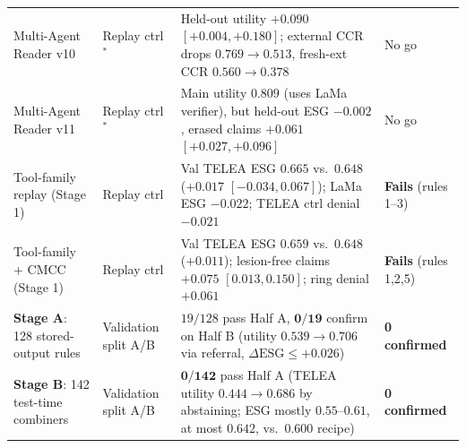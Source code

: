 \documentclass[5p,times,twocolumn,authoryear]{elsarticle}
\begin{document}
\begin{table}[!htbp]
\begin{center}
{\begin{tabular}{llp{6.0cm}l}
Multi-Agent Reader v10 & Replay ctrl$^{\ast}$ & Held-out utility $+0.090$ $[+0.004, +0.180]$; external CCR drops $0.769 \to 0.513$, fresh-ext CCR $0.560 \to 0.378$ & No go \\
Multi-Agent Reader v11 & Replay ctrl$^{\ast}$ & Main utility $0.809$ (uses LaMa verifier), but held-out ESG $-0.002$, erased claims $+0.061$ $[+0.027, +0.096]$ & No go \\
Tool-family replay (Stage 1) & Replay ctrl & Val TELEA ESG $0.665$ vs.\ $0.648$ ($+0.017$ $[-0.034, 0.067]$); LaMa ESG $-0.022$; TELEA ctrl denial $-0.021$ & \textbf{Fails} (rules 1--3) \\
Tool-family + CMCC (Stage 1) & Replay ctrl & Val TELEA ESG $0.659$ vs.\ $0.648$ ($+0.011$); lesion-free claims $+0.075$ $[0.013, 0.150]$; ring denial $+0.061$ & \textbf{Fails} (rules 1,2,5) \\
\midrule
\textbf{Stage A}: 128 stored-output rules & Validation split A/B & $19/128$ pass Half A, $\mathbf{0/19}$ confirm on Half B (utility $0.539 \to 0.706$ via referral, $\Delta\text{ESG} \le +0.026$) & \textbf{0 confirmed} \\
\textbf{Stage B}: 142 test-time combiners & Validation split A/B & $\mathbf{0/142}$ pass Half A (TELEA utility $0.444 \to 0.686$ by abstaining; ESG mostly $0.55\text{--}0.61$, at most $0.642$, vs.\ $0.600$ recipe) & \textbf{0 confirmed} \\
\bottomrule
\end{tabular}%
}
\end{center}
\end{table}
\end{document}
